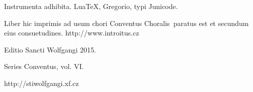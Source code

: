 \documentclass[a4paper, twoside, 12pt]{article}
\newcommand{\annusEditionis}{2015}
\begin{document}
Instrumenta adhibita.
LuaTeX, %
Gregorio, %
typi Junicode. %

\begin{center}
Liber hic imprimis ad usum chori
\guillemotright Conventus Choralis\guillemotleft\
paratus est
et secundum eius consuetudines.
http://www.introitus.cz

\vfill

{\large Editio Sancti Wolfgangi \annusEditionis.}

\vfill

Series \guillemotright Conventus\guillemotleft, vol. VI.

\vfill

http://stiwolfgangi.xf.cz

\end{center}

\vfill
\end{document}
